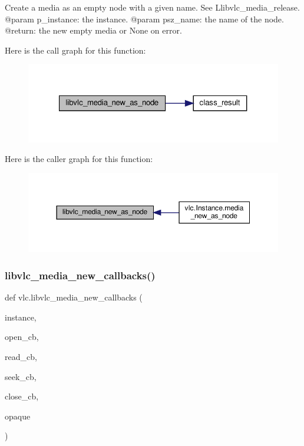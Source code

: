 \begin{DoxyVerb}Create a media as an empty node with a given name.
See L{libvlc_media_release}.
@param p_instance: the instance.
@param psz_name: the name of the node.
@return: the new empty media or None on error.
\end{DoxyVerb}
 Here is the call graph for this function\+:
\nopagebreak
\begin{figure}[H]
\begin{center}
\leavevmode
\includegraphics[width=321pt]{namespacevlc_ac0fdd830232f9a278f6631b2cf3f32d9_cgraph}
\end{center}
\end{figure}
Here is the caller graph for this function\+:
\nopagebreak
\begin{figure}[H]
\begin{center}
\leavevmode
\includegraphics[width=350pt]{namespacevlc_ac0fdd830232f9a278f6631b2cf3f32d9_icgraph}
\end{center}
\end{figure}
\mbox{\label{namespacevlc_a06f233cba42468c4eb2128bef3bd44c9}} 
\subsubsection{\texorpdfstring{libvlc\+\_\+media\+\_\+new\+\_\+callbacks()}{libvlc\_media\_new\_callbacks()}}
{\footnotesize\ttfamily def vlc.\+libvlc\+\_\+media\+\_\+new\+\_\+callbacks (\begin{DoxyParamCaption}\item[{}]{instance,  }\item[{}]{open\+\_\+cb,  }\item[{}]{read\+\_\+cb,  }\item[{}]{seek\+\_\+cb,  }\item[{}]{close\+\_\+cb,  }\item[{}]{opaque }\end{DoxyParamCaption})}

